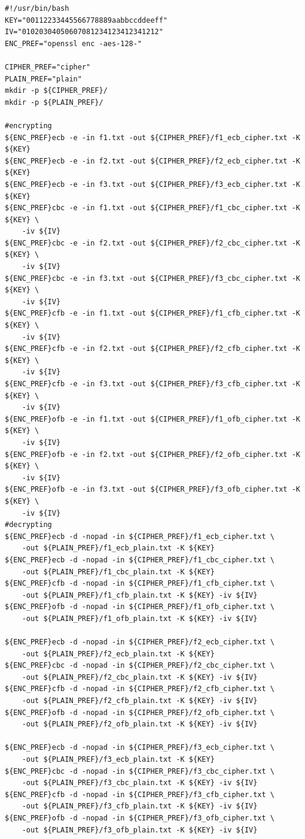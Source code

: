 \documentclass[12pt]{article}
\begin{document}
\begin{verbatim}
#!/usr/bin/bash
KEY="00112233445566778889aabbccddeeff"
IV="01020304050607081234123412341212"
ENC_PREF="openssl enc -aes-128-"

CIPHER_PREF="cipher"
PLAIN_PREF="plain"
mkdir -p ${CIPHER_PREF}/
mkdir -p ${PLAIN_PREF}/

#encrypting
${ENC_PREF}ecb -e -in f1.txt -out ${CIPHER_PREF}/f1_ecb_cipher.txt -K ${KEY}
${ENC_PREF}ecb -e -in f2.txt -out ${CIPHER_PREF}/f2_ecb_cipher.txt -K ${KEY}
${ENC_PREF}ecb -e -in f3.txt -out ${CIPHER_PREF}/f3_ecb_cipher.txt -K ${KEY}
${ENC_PREF}cbc -e -in f1.txt -out ${CIPHER_PREF}/f1_cbc_cipher.txt -K ${KEY} \
    -iv ${IV}
${ENC_PREF}cbc -e -in f2.txt -out ${CIPHER_PREF}/f2_cbc_cipher.txt -K ${KEY} \
    -iv ${IV}
${ENC_PREF}cbc -e -in f3.txt -out ${CIPHER_PREF}/f3_cbc_cipher.txt -K ${KEY} \
    -iv ${IV}
${ENC_PREF}cfb -e -in f1.txt -out ${CIPHER_PREF}/f1_cfb_cipher.txt -K ${KEY} \
    -iv ${IV}
${ENC_PREF}cfb -e -in f2.txt -out ${CIPHER_PREF}/f2_cfb_cipher.txt -K ${KEY} \
    -iv ${IV}
${ENC_PREF}cfb -e -in f3.txt -out ${CIPHER_PREF}/f3_cfb_cipher.txt -K ${KEY} \
    -iv ${IV}
${ENC_PREF}ofb -e -in f1.txt -out ${CIPHER_PREF}/f1_ofb_cipher.txt -K ${KEY} \
    -iv ${IV}
${ENC_PREF}ofb -e -in f2.txt -out ${CIPHER_PREF}/f2_ofb_cipher.txt -K ${KEY} \
    -iv ${IV}
${ENC_PREF}ofb -e -in f3.txt -out ${CIPHER_PREF}/f3_ofb_cipher.txt -K ${KEY} \
    -iv ${IV}
#decrypting
${ENC_PREF}ecb -d -nopad -in ${CIPHER_PREF}/f1_ecb_cipher.txt \
    -out ${PLAIN_PREF}/f1_ecb_plain.txt -K ${KEY}
${ENC_PREF}ecb -d -nopad -in ${CIPHER_PREF}/f1_cbc_cipher.txt \
    -out ${PLAIN_PREF}/f1_cbc_plain.txt -K ${KEY}
${ENC_PREF}cfb -d -nopad -in ${CIPHER_PREF}/f1_cfb_cipher.txt \
    -out ${PLAIN_PREF}/f1_cfb_plain.txt -K ${KEY} -iv ${IV}
${ENC_PREF}ofb -d -nopad -in ${CIPHER_PREF}/f1_ofb_cipher.txt \
    -out ${PLAIN_PREF}/f1_ofb_plain.txt -K ${KEY} -iv ${IV}

${ENC_PREF}ecb -d -nopad -in ${CIPHER_PREF}/f2_ecb_cipher.txt \
    -out ${PLAIN_PREF}/f2_ecb_plain.txt -K ${KEY}
${ENC_PREF}cbc -d -nopad -in ${CIPHER_PREF}/f2_cbc_cipher.txt \
    -out ${PLAIN_PREF}/f2_cbc_plain.txt -K ${KEY} -iv ${IV}
${ENC_PREF}cfb -d -nopad -in ${CIPHER_PREF}/f2_cfb_cipher.txt \
    -out ${PLAIN_PREF}/f2_cfb_plain.txt -K ${KEY} -iv ${IV}
${ENC_PREF}ofb -d -nopad -in ${CIPHER_PREF}/f2_ofb_cipher.txt \
    -out ${PLAIN_PREF}/f2_ofb_plain.txt -K ${KEY} -iv ${IV}

${ENC_PREF}ecb -d -nopad -in ${CIPHER_PREF}/f3_ecb_cipher.txt \
    -out ${PLAIN_PREF}/f3_ecb_plain.txt -K ${KEY}
${ENC_PREF}cbc -d -nopad -in ${CIPHER_PREF}/f3_cbc_cipher.txt \
    -out ${PLAIN_PREF}/f3_cbc_plain.txt -K ${KEY} -iv ${IV}
${ENC_PREF}cfb -d -nopad -in ${CIPHER_PREF}/f3_cfb_cipher.txt \
    -out ${PLAIN_PREF}/f3_cfb_plain.txt -K ${KEY} -iv ${IV}
${ENC_PREF}ofb -d -nopad -in ${CIPHER_PREF}/f3_ofb_cipher.txt \
    -out ${PLAIN_PREF}/f3_ofb_plain.txt -K ${KEY} -iv ${IV}


\end{verbatim}
\end{document}
